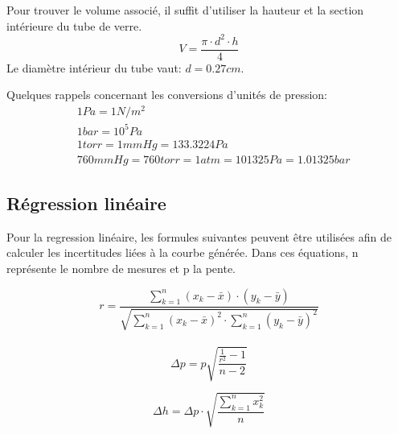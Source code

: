 Pour trouver le volume associé, il suffit d'utiliser la hauteur et la section intérieure du tube de verre.
\begin{equation}
    \label{volume}
    V = \frac{\pi \cdot d^2 \cdot h}{4}
\end{equation}
Le diamètre intérieur du tube vaut: $d=0.27cm$.

Quelques rappels concernant les conversions d'unités de pression:
\begin{align*}
    &1Pa = 1 N/m^2\\
    &1bar = 10^5 Pa\\
    &1torr = 1mmHg = 133.3224 Pa\\
    &760mmHg = 760torr=1atm=101325Pa=1.01325bar
\end{align*}

\subsection{Régression linéaire}

Pour la regression linéaire, les formules suivantes peuvent être utilisées afin de calculer les incertitudes liées à la courbe générée.
Dans ces équations, n représente le nombre de mesures et p la pente.

\begin{equation}
    \label{regressionr}
    r=\frac{\sum_{k=1}^{n}(x_k-\bar{x})\cdot(y_k-\bar{y})}{\sqrt{\sum_{k=1}^{n}(x_k-\bar{x})^2\cdot\sum_{k=1}^{n}(y_k-\bar{y})^2}}
\end{equation}
\\

\begin{equation}
    \label{deltam}
    \Delta p=p\sqrt{\frac{\frac{1}{r^2}-1}{n-2}}
\end{equation}

\begin{equation}
    \label{deltah}
    \Delta h = \Delta p \cdot \sqrt{\frac{\sum_{k=1}^{n}x_k^2}{n}}
\end{equation}
